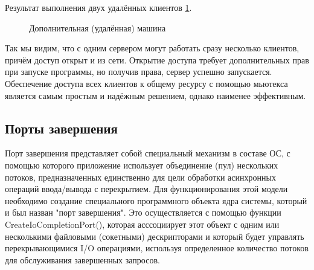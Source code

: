 \documentclass[a4paper]{article}
\begin{document}
	Результат выполнения двух удалённых клиентов \ref{img:task6_3}.
	\begin{figure}[h!]
		\caption{Дополнительная (удалённая) машина}
		\label{img:task6_3}
	\end{figure}
	
Так мы видим, что с одним сервером могут работать сразу несколько клиентов, причём доступ открыт и из сети. Открытие доступа требует дополнительных прав при запуске программы, но получив права, сервер успешно запускается. Обеспечение доступа всех клиентов к общему ресурсу с помощью мьютекса является самым простым и надёжным решением, однако наименее эффективным.
	
\subsection{Порты завершения}
Порт завершения представляет собой специальный механизм в составе ОС, с помощью которого приложение использует объединение (пул) нескольких потоков, предназначенных единственно для цели обработки асинхронных операций ввода/вывода с перекрытием.
Для функционирования этой модели необходимо создание специального программного объекта ядра системы, который и был назван "порт завершения". Это осуществляется с помощью функции CreateIoCompletionPort(), которая асссоциирует этот объект с одним или несколькими файловыми (сокетными) дескрипторами и который будет управлять перекрывающимися I/O операциями, используя определенное количество потоков для обслуживания завершенных запросов. 
\end{document}
